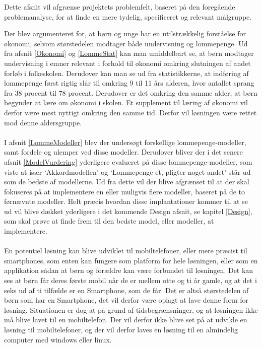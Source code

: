 Dette afsnit vil afgrænse projektets problemfelt, baseret på den foregående problemanalyse, for at finde en mere tydelig, specificeret og relevant målgruppe.

Der blev argumenteret for, at børn og unge har en utilstrækkelig forståelse for økonomi, selvom størstedelen modtager både undervisning og lommepenge. Ud fra afsnit \ref{Okonomi}  og \ref{LommeStat}  kan man umiddelbart se, at børn modtager undervisning i emner relevant i forhold til økonomi omkring slutningen af andet forløb i folkeskolen. Derudover kan man se ud fra statistikkerne, at indføring af lommepenge først rigtig slår til omkring 9 til 11 års alderen, hvor antallet sprang fra 38 procent til 78 procent. Derudover er det omkring den samme alder, at børn begynder at lære om økonomi i skolen. Et supplement til læring af økonomi vil derfor være mest nyttigt omkring den samme tid. Derfor vil løsningen være rettet mod denne aldersgruppe.\\
\\
I afsnit \ref{LommeModeller} blev der undersøgt forskellige lommepenge-modeller, samt fordele og ulemper ved disse modeller. Derudover bliver der i det senere afsnit \ref{ModelVurdering} yderligere evalueret på disse lommepenge-modeller, som viste at især ‘Akkordmodellen’ og ‘Lommepenge et, pligter noget andet’ står ud som de bedste af modellerne. Ud fra dette vil der blive afgrænset til at der skal fokuseres på at implementere en eller muligvis flere modeller, baseret på de to førnævnte modeller. Helt præcis hvordan disse implantationer kommer til at se ud vil blive dækket yderligere i det kommende Design afsnit, se kapitel \ref{Design}, som skal prøve at finde frem til den bedste model, eller modeller, at implementere. \\
\\
En potentiel løsning kan blive udviklet til mobiltelefoner, eller mere præcist til smartphones, som enten kan fungere som platform for hele løsningen, eller som en applikation sådan at børn og forældre kan være forbundet til løsningen. Det kan ses at børn får deres første mobil når de er mellem otte og ti år gamle, og at det i seks ud af ti tilfælde er en Smartphone, som de får\cite{BornSmart}. Det er altså størstedelen af børn som har en Smartphone, det vil derfor være oplagt at lave denne form for løsning. Situationen er dog at på grund af tidsbegrænsninger, og at løsningen ikke må blive lavet til en mobiltelefon. Der vil derfor ikke blive set på at udvikle en løsning til mobiltelefoner, og der vil derfor laves en løsning til en almindelig computer med windows eller linux.\\
